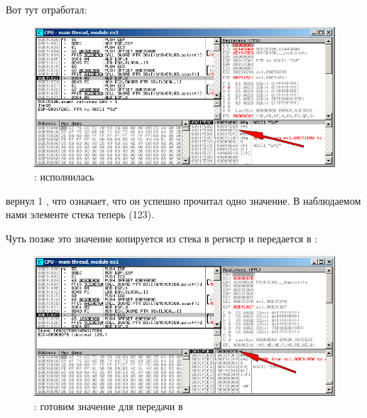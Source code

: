 \clearpage
Вот тут \scanf отработал:

\begin{figure}[H]
\centering
\includegraphics[scale=\FigScale]{patterns/04_scanf/1_simple/ex1_olly_3.png}
\caption{\olly: \scanf исполнилась}
\label{fig:scanf_ex1_olly_3}
\end{figure}

\scanf вернул 1 \InENRU \EAX, что означает, что он успешно прочитал одно значение.
В наблюдаемом нами элементе стека теперь  (123).

\clearpage
Чуть позже это значение копируется из стека в регистр \ECX и передается в \printf{}:

\begin{figure}[H]
\centering
\includegraphics[scale=\FigScale]{patterns/04_scanf/1_simple/ex1_olly_4.png}
\caption{\olly: готовим значение для передачи в \printf}
\label{fig:scanf_ex1_olly_4}
\end{figure}
